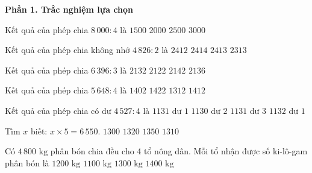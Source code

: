 \textbf{Phần 1. Trắc nghiệm lựa chọn}

\begin{ex} %
Kết quả của phép chia $8\,000 : 4$ là
\choice
{$1500$}
{\True $2000$}
{$2500$}
{$3000$}
\end{ex}

\begin{ex} %
Kết quả của phép chia không nhớ $4\,826 : 2$ là
\choice
{$2412$}
{$2414$}
{\True $2413$}
{$2313$}
\end{ex}

\begin{ex} %
Kết quả của phép chia $6\,396 : 3$ là
\choice
{\True $2132$}
{$2122$}
{$2142$}
{$2136$}
\end{ex}

\begin{ex} %
Kết quả của phép chia $5\,648 : 4$ là
\choice
{$1402$}
{$1422$}
{$1312$}
{\True $1412$}
\end{ex}

\begin{ex} %
Kết quả của phép chia có dư $4\,527 : 4$ là
\choice
{$1131$ dư $1$}
{$1130$ dư $2$}
{\True $1131$ dư $3$}
{$1132$ dư $1$}
\end{ex}

\begin{ex} %
Tìm $x$ biết: $x \times 5 = 6\,550$.
\choice
{$1300$}
{$1320$}
{$1350$}
{\True $1310$}
\end{ex}

\begin{ex} %
Có $4\,800\text{ kg}$ phân bón chia đều cho 4 tổ nông dân. Mỗi tổ nhận được số ki-lô-gam phân bón là
\choice
{\True $1200\text{ kg}$}
{$1100\text{ kg}$}
{$1300\text{ kg}$}
{$1400\text{ kg}$}
\end{ex}

